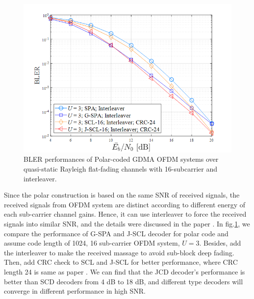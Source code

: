 \begin{figure}[b!]
 \centering
 \includegraphics[width=14cm]{fig/bler_gspa_jscl_u3.png}
 \caption{BLER performances of Polar-coded GDMA OFDM systems over quasi-static Rayleigh flat-fading channels with 16-subcarrier and interleaver.}
 \label{fig:bler_ofdm_polar_scl_gspa}
\end{figure}


Since the polar construction is based on the same SNR of received signals, the received signals from OFDM system are distinct according to different energy of each sub-carrier channel gains. Hence, it can use interleaver to force the received signals into similar SNR, and the details were discussed in the paper \cite{lee2019curve}. In fig.\ref{fig:bler_ofdm_polar_scl_gspa}, we compare the performance of G-SPA and J-SCL decoder for polar code and assume code length of 1024, 16 sub-carrier OFDM system, $U=3$. Besides, add the interleaver to make the received massage to avoid sub-block deep fading. Then, add CRC check to SCL and J-SCL for better performance, where CRC length 24 is same as paper \cite{niu2012crc}. We can find that the JCD decoder's performance is better than SCD decoders from 4 dB to 18 dB, and different type decoders will converge in different performance in high SNR. 


